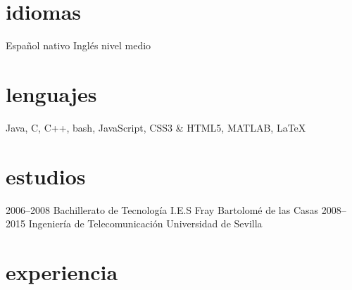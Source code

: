\documentclass[hidelinks]{friggeri-cv} %
\begin{document}
\begin{aside}
\section{idiomas}
Español nativo
Inglés nivel medio
\section{lenguajes}
{Java, C, C++, bash, JavaScript, CSS3 \& HTML5, MATLAB, \LaTeX}
\end{aside}


\section{estudios}

\begin{entrylist}
\entry
{2006--2008}
{Bachillerato {\normalfont de Tecnología}}
{I.E.S Fray Bartolomé de las Casas}
{}
\entry
{2008--2015}
{Ingeniería {\normalfont de Telecomunicación}}
{Universidad de Sevilla}
{}
\end{entrylist}


\section{experiencia}
\end{document}
